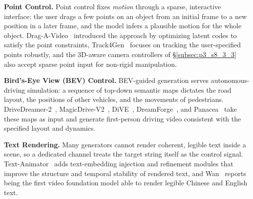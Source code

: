 \noindent\textbf{Point Control.} Point control fixes \emph{motion} through a sparse, interactive interface: the user drags a few points on an object from an initial frame to a new position in a later frame, and the model infers a plausible motion for the whole object. Drag-A-Video~\cite{teng2023drag} introduced the approach by optimizing latent codes to satisfy the point constraints, Track4Gen~\cite{jeong2025track4genteachingvideodiffusion} focuses on tracking the user-specified points robustly, and the 3D-aware camera controllers of §\ref{subsec:p3_s8_3_3}~\cite{gu2025diffusionshader3dawarevideo,bian2025gsditadvancingvideogeneration} also accept sparse point input for non-rigid manipulation.

\noindent\textbf{Bird's-Eye View (BEV) Control.} BEV-guided generation serves autonomous-driving simulation: a sequence of top-down semantic maps dictates the road layout, the positions of other vehicles, and the movements of pedestrians. DriveDreamer-2~\cite{zhao2024drivedreamer2llmenhancedworldmodels}, MagicDrive-V2~\cite{gao2025magicdrivev2highresolutionlongvideo}, DiVE~\cite{jiang2024dive}, DreamForge~\cite{mei2024dreamforge}, and Panacea~\cite{wen2023panaceapanoramiccontrollablevideo} take these maps as input and generate first-person driving video consistent with the specified layout and dynamics.

\noindent\textbf{Text Rendering.} Many generators cannot render coherent, legible text inside a scene, so a dedicated channel treats the target string itself as the control signal. Text-Animator~\cite{liu2024textanimatorcontrollablevisualtext} adds text-embedding injection and refinement modules that improve the structure and temporal stability of rendered text, and Wan~\cite{wan2025wan} reports being the first video foundation model able to render legible Chinese and English text.

